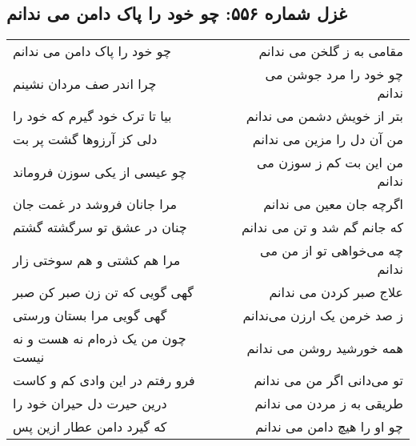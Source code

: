 \begin{center}
\section*{غزل شماره ۵۵۶: چو خود را پاک دامن می ندانم}
\label{sec:556}
\begin{longtable}{l p{0.5cm} r}
چو خود را پاک دامن می ندانم
&&
مقامی به ز گلخن می ندانم
\\
چرا اندر صف مردان نشینم
&&
چو خود را مرد جوشن می ندانم
\\
بیا تا ترک خود گیرم که خود را
&&
بتر از خویش دشمن می ندانم
\\
دلی کز آرزوها گشت پر بت
&&
من آن دل را مزین می ندانم
\\
چو عیسی از یکی سوزن فروماند
&&
من این بت کم ز سوزن می ندانم
\\
مرا جانان فروشد در غمت جان
&&
اگرچه جان معین می ندانم
\\
چنان در عشق تو سرگشته گشتم
&&
که جانم گم شد و تن می ندانم
\\
مرا هم کشتی و هم سوختی زار
&&
چه می‌خواهی تو از من می ندانم
\\
گهی گویی که تن زن صبر کن صبر
&&
علاج صبر کردن می ندانم
\\
گهی گویی مرا بستان ورستی
&&
ز صد خرمن یک ارزن می‌ندانم
\\
چون من یک ذره‌ام نه هست و نه نیست
&&
همه خورشید روشن می ندانم
\\
فرو رفتم در این وادی کم و کاست
&&
تو می‌دانی اگر من می ندانم
\\
درین حیرت دل حیران خود را
&&
طریقی به ز مردن می ندانم
\\
که گیرد دامن عطار ازین پس
&&
چو او را هیچ دامن می ندانم
\\
\end{longtable}
\end{center}
